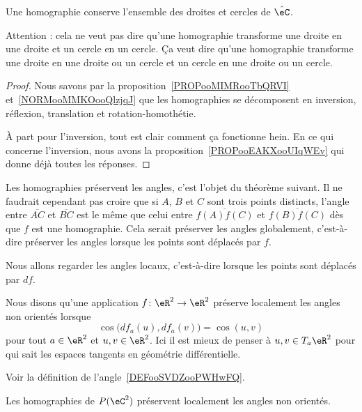 \begin{proposition}     \label{PROPooYFJBooAWxFIs}
    Une homographie conserve l'ensemble des droites et cercles de $\hat\eC$.
\end{proposition}
Attention : cela ne veut pas dire qu'une homographie transforme une droite en une droite et un cercle en un cercle. Ça veut dire qu'une homographie transforme une droite en une droite ou un cercle et un cercle en une droite ou un cercle.

\begin{proof}
    Nous savons par la proposition~\ref{PROPooMIMRooTbQRVI} et~\ref{NORMooMMKOooQlzjqJ} que les homographies se décomposent en inversion, réflexion, translation et rotation-homothétie.

    À part pour l'inversion, tout est clair comment ça fonctionne hein. En ce qui concerne l'inversion, nous avons la proposition~\ref{PROPooEAKXooUIqWEv} qui donne déjà toutes les réponses.

\end{proof}

\begin{normaltext}
    Les homographies préservent les angles, c'est l'objet du théorème suivant. Il ne faudrait cependant pas croire que si \( A\), \( B\) et \( C\) sont trois points distincts, l'angle entre \( \overline{ AC }\) et \( \overline{ BC }\) est le même que celui entre \( \overline{ f(A)f(C) }\) et \( \overline{ f(B)f(C) }\) dès que \( f\) est une homographie. Cela serait préserver les angles globalement, c'est-à-dire préserver les angles lorsque les points sont déplacés par \( f\).

    Nous allons regarder les angles locaux, c'est-à-dire lorsque les points sont déplacés par \( df\).
\end{normaltext}

\begin{definition}
    Nous disons qu'une application \( f\colon \eR^2\to \eR^2\) préserve localement les angles non orientés lorsque
    \begin{equation}
        \cos\big( df_a(u),df_a(v) \big)=\cos(u,v)
    \end{equation}
    pour tout \( a\in \eR^2\) et \( u,v\in \eR^2\). Ici il est mieux de penser à \( u,v\in T_a\eR^2\) pour qui sait les espaces tangents en géométrie différentielle.
\end{definition}
Voir la définition de l'angle~\ref{DEFooSVDZooPWHwFQ}.

\begin{theorem}
    Les homographies de \( P(\eC^2)\) préservent localement les angles non orientés.
\end{theorem}

